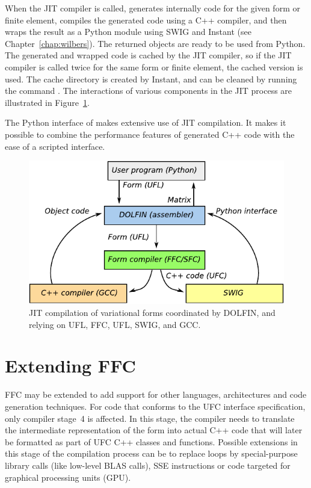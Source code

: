 When the JIT compiler is called, \ffc{} generates internally \ufc{}
code for the given form or finite element, compiles the generated code
using a C++ compiler, and then wraps the result as a Python module using
SWIG and Instant (see Chapter~\ref{chap:wilbers}).  The returned objects
are ready to be used from Python.  The generated and wrapped code is
cached by the JIT compiler, so if the JIT compiler is called twice
for the same form or finite element, the cached version is used. The
cache directory is created by Instant, and can be cleaned by running the
command .  The interactions of various components in
the JIT process are illustrated in Figure~\ref{fig:logg-1:jit}.

The Python interface of \dolfin{} makes extensive use of JIT
compilation. It makes it possible to combine the performance features
of generated C++ code with the ease of a scripted interface.

\begin{figure}
\bwfig
  \centering
  \includegraphics[width=\largefig]{chapters/logg-1/pdf/jit.pdf}
  \caption{JIT compilation of variational forms coordinated by
    DOLFIN, and relying on UFL, FFC, UFL, SWIG, and GCC.}
  \label{fig:logg-1:jit}
\end{figure}

\section{Extending FFC}

FFC may be extended to add support for other languages, architectures
and code generation techniques. For code that conforms to the UFC
interface specification, only compiler stage~4 is affected. In this
stage, the compiler needs to translate the intermediate representation
of the form into actual C++ code that will later be formatted as part
of UFC C++ classes and functions. Possible extensions in this stage of
the compilation process can be to replace loops by special-purpose
library calls (like low-level BLAS calls), SSE instructions or code
targeted for graphical processing units (GPU).

